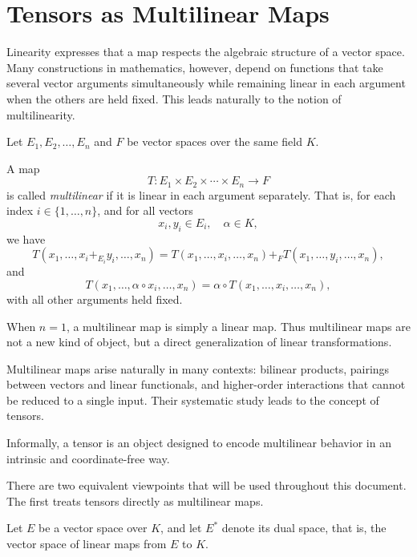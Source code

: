 \chapter{Tensors as Multilinear Maps}

Linearity expresses that a map respects the algebraic structure of a vector space.
Many constructions in mathematics, however, depend on functions that take several
vector arguments simultaneously while remaining linear in each argument when the
others are held fixed. This leads naturally to the notion of multilinearity.

\medskip

Let \(E_1, E_2, \dots, E_n\) and \(F\) be vector spaces over the same field \(K\).

\begin{definition}
A map
\[
T : E_1 \times E_2 \times \cdots \times E_n \to F
\]
is called \emph{multilinear} if it is linear in each argument separately.
That is, for each index \(i \in \{1,\dots,n\}\), and for all vectors
\[
x_i, y_i \in E_i, \quad \alpha \in K,
\]
we have
\[
T(x_1,\dots,x_i +_{E_i} y_i,\dots,x_n)
=
T(x_1,\dots,x_i,\dots,x_n)
+_F
T(x_1,\dots,y_i,\dots,x_n),
\]
and
\[
T(x_1,\dots,\alpha \circ x_i,\dots,x_n)
=
\alpha \circ T(x_1,\dots,x_i,\dots,x_n),
\]
with all other arguments held fixed.
\end{definition}

When \(n=1\), a multilinear map is simply a linear map.
Thus multilinear maps are not a new kind of object, but a direct generalization
of linear transformations.

\medskip

Multilinear maps arise naturally in many contexts:
bilinear products, pairings between vectors and linear functionals,
and higher-order interactions that cannot be reduced to a single input.
Their systematic study leads to the concept of tensors.

\medskip

Informally, a tensor is an object designed to encode multilinear behavior
in an intrinsic and coordinate-free way.

\medskip

There are two equivalent viewpoints that will be used throughout this document.
The first treats tensors directly as multilinear maps.

\medskip

Let \(E\) be a vector space over \(K\), and let \(E^*\) denote its dual space,
that is, the vector space of linear maps from \(E\) to \(K\).

